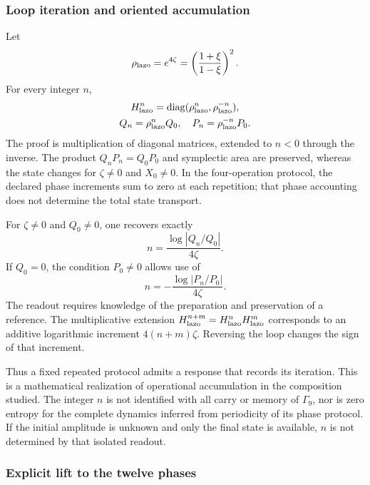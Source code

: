 \subsubsection{Loop iteration and oriented accumulation}
\label{md:comp:iteracion}

Let
\[
 \rho_{\rm lazo}=e^{4\zeta}
 =\left(\frac{1+\xi}{1-\xi}\right)^2.
\]
For every integer \(n\),
\begin{equation}
 \begin{gathered}
 H_{\rm lazo}^n
 =\operatorname{diag}(\rho_{\rm lazo}^{n},\rho_{\rm lazo}^{-n}),
 \\
 Q_n=\rho_{\rm lazo}^{n}Q_0,\quad
 P_n=\rho_{\rm lazo}^{-n}P_0.
 \end{gathered}
 \label{md:comp:iteracion-diagonal}
\end{equation}
The proof is multiplication of diagonal matrices, extended to \(n<0\)
through the inverse. The product \(Q_nP_n=Q_0P_0\) and symplectic
area are preserved, whereas the state changes for \(\zeta\ne0\) and
\(X_0\ne0\). In the four-operation protocol, the declared phase
increments sum to zero at each repetition; that phase accounting does
not determine the total state transport.

For \(\zeta\ne0\) and \(Q_0\ne0\), one recovers exactly
\[
 n=\frac{\log|Q_n/Q_0|}{4\zeta}.
\]
If \(Q_0=0\), the condition \(P_0\ne0\) allows use of
\[
 n=-\frac{\log|P_n/P_0|}{4\zeta}.
\]
The readout requires knowledge of the preparation and preservation of a
reference. The multiplicative extension
\(H_{\rm lazo}^{n+m}=H_{\rm lazo}^{n}H_{\rm lazo}^{m}\)
corresponds to an additive logarithmic increment \(4(n+m)\zeta\).
Reversing the loop changes the sign of that increment.

Thus a fixed repeated protocol admits a response that records its
iteration. This is a mathematical realization of operational accumulation
in the composition studied. The integer \(n\) is not identified with
all carry or memory of \(\Gamma_9\), nor is zero entropy for the complete
dynamics inferred from periodicity of its phase protocol. If the initial
amplitude is unknown and only the final state is available, \(n\) is
not determined by that isolated readout.

\subsubsection{Explicit lift to the twelve phases}
\label{md:comp:levantamiento}

